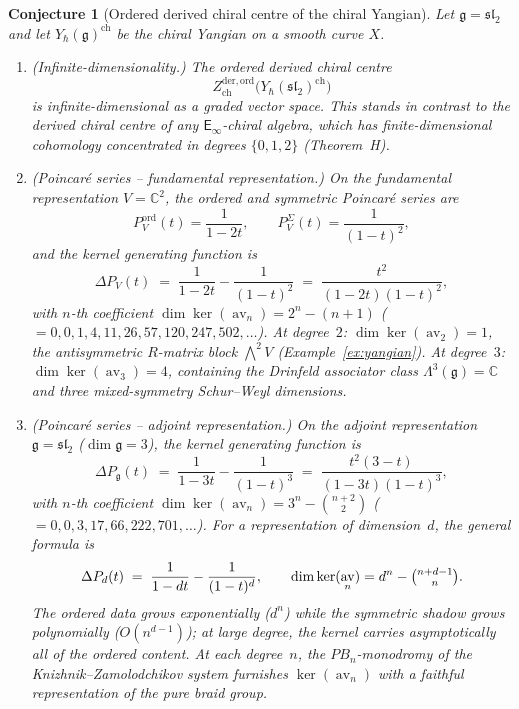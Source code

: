 \documentclass[11pt,reqno]{amsart}
\newtheorem{conjecture}[theorem]{Conjecture}
\theoremstyle{definition}
\theoremstyle{remark}
\newcommand{\Einf}{\mathsf{E}_{\infty}}
\DeclareMathOperator{\av}{av}
\newcommand{\fg}{\mathfrak{g}}
\newcommand{\CC}{\mathbb{C}}
\numberwithin{equation}{section}
\begin{document}
\begin{conjecture}[Ordered derived chiral centre of the
chiral Yangian]
\label{conj:yangian-ordered-center}
Let $\fg = \mathfrak{sl}_2$ and let
$Y_\hbar(\fg)^{\mathrm{ch}}$ be the chiral Yangian on a
smooth curve $X$.
\begin{enumerate}[label=\textup{(\roman*)}]
\item \textup{(Infinite-dimensionality.)}
  The ordered derived chiral centre
  \[
    Z^{\mathrm{der,ord}}_{\mathrm{ch}}\bigl(
      Y_\hbar(\mathfrak{sl}_2)^{\mathrm{ch}}\bigr)
  \]
  is infinite-dimensional as a graded vector space.
  This stands in contrast to the derived chiral centre of
  any $\Einf$-chiral algebra, which has finite-dimensional
  cohomology concentrated in degrees $\{0,1,2\}$
  \textup{(Theorem~H)}.

\item \textup{(Poincar\'e series -- fundamental
  representation.)}
  On the fundamental representation $V = \CC^2$, the
  ordered and symmetric Poincar\'e series are
  \[
    P^{\mathrm{ord}}_V(t) = \frac{1}{1 - 2t},
    \qquad
    P^{\Sigma}_V(t) = \frac{1}{(1-t)^2},
  \]
  and the kernel generating function is
  \begin{equation}\label{eq:conj-kernel-gf-fund}
    \Delta P_V(t)
    \;=\; \frac{1}{1 - 2t} - \frac{1}{(1-t)^2}
    \;=\; \frac{t^2}{(1 - 2t)(1-t)^2},
  \end{equation}
  with $n$-th coefficient
  $\dim\ker(\av_n) = 2^n - (n+1)$
  \textup{(}$= 0, 0, 1, 4, 11, 26, 57, 120, 247,
  502, \ldots$\textup{)}.
  At degree~$2$: $\dim\ker(\av_2) = 1$, the
  antisymmetric $R$-matrix block $\bigwedge^2 V$
  \textup{(Example~\ref{ex:yangian})}.
  At degree~$3$: $\dim\ker(\av_3) = 4$, containing the
  Drinfeld associator class $\Lambda^3(\fg) = \CC$ and
  three mixed-symmetry Schur--Weyl dimensions.

\item \textup{(Poincar\'e series -- adjoint
  representation.)}
  On the adjoint representation $\fg = \mathfrak{sl}_2$
  \textup{(}$\dim \fg = 3$\textup{)}, the kernel
  generating function is
  \begin{equation}\label{eq:conj-kernel-gf-adj}
    \Delta P_\fg(t)
    \;=\; \frac{1}{1 - 3t}
      - \frac{1}{(1-t)^3}
    \;=\; \frac{t^2(3 - t)}{(1 - 3t)(1-t)^3},
  \end{equation}
  with $n$-th coefficient
  $\dim\ker(\av_n) = 3^n - \binom{n+2}{2}$
  \textup{(}$= 0, 0, 3, 17, 66, 222, 701,
  \ldots$\textup{)}.
  For a representation of dimension~$d$, the general
  formula is
  \begin{equation}\label{eq:conj-kernel-gf-general}
    \Delta P_d(t)
    \;=\; \frac{1}{1 - dt} - \frac{1}{(1-t)^d},
    \qquad
    \dim\ker(\av_n)
    = d^n - \tbinom{n + d - 1}{n}.
  \end{equation}
  The ordered data grows exponentially ($d^n$) while
  the symmetric shadow grows polynomially
  ($O(n^{d-1})$); at large degree, the kernel
  carries asymptotically all of the ordered content.
  At each degree~$n$, the $PB_n$-monodromy of the
  Knizhnik--Zamolodchikov system furnishes
  $\ker(\av_n)$ with a faithful representation of the
  pure braid group.


\end{enumerate}
\end{conjecture}
\end{document}

